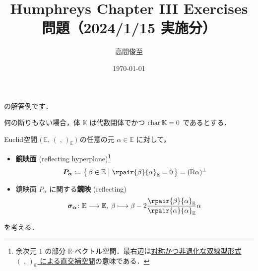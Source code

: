 \documentclass{ltjsarticle}
\theoremstyle{mystyle} %
\numberwithin{equation}{section}
\newcommand{\lto}{\longrightarrow}
\newcommand{\lmto}{\longmapsto}
\newcommand{\Euc}[1]{\bigl(\, #1,\, (\;,\,)_{#1}\,\bigr)}
\begin{document}
\title{Humphreys Chapter III Exercises \\ 問題（2024/1/15 実施分）}
\author{高間俊至}
\date{\today}
\maketitle

\setcounter{section}{6}

\cite[p.63, Exercise1, 3]{Humphreys1972introduction}
の解答例です．

何の断りもない場合，体 $\mathbb{K}$ は代数閉体でかつ $\operatorname{char} \mathbb{K} = 0$ であるとする．


Euclid空間 $\Euc{\mathbb{E}}$ の任意の元 $\alpha \in \mathbb{E}$ に対して，
\begin{itemize}
    \item \textbf{鏡映面} (reflecting hyperplane)\footnote{余次元 $1$ の部分 $\mathbb{R}$-ベクトル空間．最右辺は\hyperref[def:radical-bilinear]{対称かつ非退化な双線型形式 $(\;,\,)_{\mathbb{E}}$ による直交補空間}の意味である．}
    \begin{align}
        \label{def:hyperplane}
        \bm{P_\alpha} \coloneqq \bigl\{\, \beta \in \mathbb{E} \bigm| \rpair{\beta}{\alpha}_{\mathbb{E}} = 0 \,\bigr\} = (\mathbb{R}\alpha)^\perp
    \end{align}
    \item 鏡映面 $P_\alpha$ に関する\textbf{鏡映} (reflecting)
    \begin{align}
        \bm{\sigma_\alpha} \colon \mathbb{E} \lto \mathbb{E},\; \beta \lmto \beta - 2 \frac{\rpair{\beta}{\alpha}_{\mathbb{E}}}{\rpair{\alpha}{\alpha}_{\mathbb{E}}} \alpha
    \end{align}
\end{itemize}
を考える．
\end{document}
